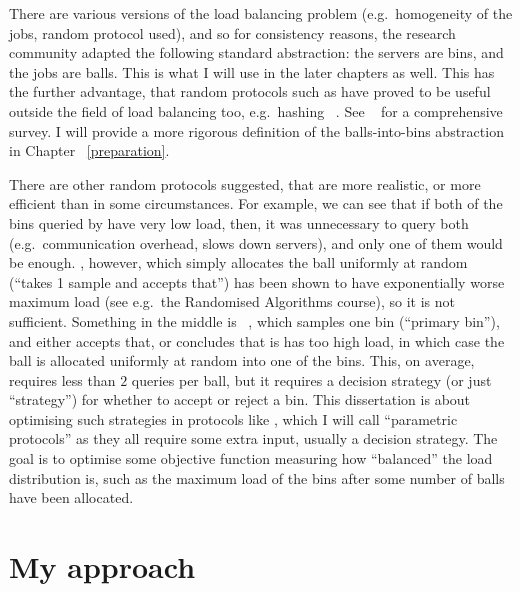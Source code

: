 There are various versions of the load balancing problem (e.g.\ homogeneity of the jobs, random protocol used), and so for consistency reasons, the research community adapted the following standard abstraction: the servers are bins, and the jobs are balls. This is what I will use in the later chapters as well. This has the further advantage, that random protocols such as \TwoChoice have proved to be useful outside the field of load balancing too, e.g.\ hashing ~\cite{azar1999twochoice}. See ~\cite{udi2017ballsintobinslandscape} for a comprehensive survey. I will provide a more rigorous definition of the balls-into-bins abstraction in Chapter ~\ref{preparation}.


There are other random protocols suggested, that are more realistic, or more efficient than \TwoChoice in some circumstances. For example, we can see that if both of the bins queried by \TwoChoice have very low load, then, it was unnecessary to query both (e.g.\ communication overhead, slows down servers), and only one of them would be enough. \OneChoice, however, which simply allocates the ball uniformly at random (``takes 1 sample and accepts that'') has been shown to have exponentially worse maximum load (see e.g.\ the Randomised Algorithms course), so it is not sufficient. Something in the middle is \TwoThinning ~\cite{feldheim2021thinning}, which samples one bin (``primary bin''), and either accepts that, or concludes that is has too high load, in which case the ball is allocated uniformly at random into one of the bins. This, on average, requires less than $2$ queries per ball, but it requires a decision strategy (or just ``strategy'') for whether to accept or reject a bin. This dissertation is about optimising such strategies in protocols like \TwoThinning, which I will call ``parametric protocols'' as they all require some extra input, usually a decision strategy. The goal is to optimise some objective function measuring how ``balanced'' the load distribution is, such as the maximum load of the bins after some number of balls have been allocated.



\section{My approach}

